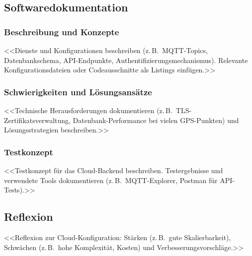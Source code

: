 \subsection{Softwaredokumentation}

\subsubsection{Beschreibung und Konzepte}
<<Dienste und Konfigurationen beschreiben (z.\,B.\ MQTT-Topics, Datenbankschema,
API-Endpunkte, Authentifizierungsmechanismus). Relevante Konfigurationsdateien
oder Codeausschnitte als Listings einfügen.>>


\subsubsection{Schwierigkeiten und Lösungsansätze}
<<Technische Herausforderungen dokumentieren (z.\,B.\ TLS-Zertifikatsverwaltung,
Datenbank-Performance bei vielen GPS-Punkten) und Lösungsstrategien beschreiben.>>

\subsubsection{Testkonzept}
<<Testkonzept für das Cloud-Backend beschreiben. Testergebnisse und
verwendete Tools dokumentieren (z.\,B.\ MQTT-Explorer, Postman für API-Tests).>>

\subsection{Reflexion}
<<Reflexion zur Cloud-Konfiguration: Stärken (z.\,B.\ gute Skalierbarkeit),
Schwächen (z.\,B.\ hohe Komplexität, Kosten) und Verbesserungsvorschläge.>>
